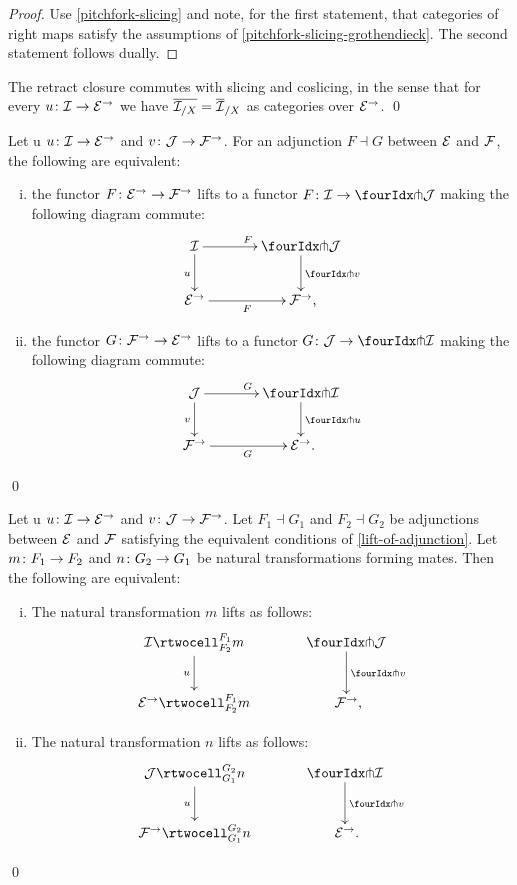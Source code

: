 \documentclass[reqno,10pt,a4paper,oneside,draft]{amsart}
\begin{document}
{{\begin{proof}
Use \cref{pitchfork-slicing} and note, for the first statement, that categories of right maps satisfy the assumptions of \cref{pitchfork-slicing-grothendieck}.
The second statement follows dually.
\end{proof}

\begin{proposition}
The retract closure commutes with slicing and coslicing, in the sense that for every $u \co \cal{I} \to \catE^\to$ we have
$\overline{\cal{I}_{/X}} = \overline{\cal{I}}_{/X}$ as categories over $\catE^\to$.
\qed
\end{proposition}




\begin{proposition} \label{lift-of-adjunction}
Let u $u \co \cal{I} \to \catE^\to$ and $v \co \cal{J} \to \cal{F}^\to$.
For an adjunction $F \dashv G$ between $\cal{E}$ and $\cal{F}$, the following are equivalent:
\begin{enumerate}[(i)]
\item the functor $F \co \catE^\to \to \cal{F}^\to$ lifts to a functor $F \co \cal{I} \to \liftl{\cal{J}}$ making the following diagram commute:
\[
\xymatrix@C=1.2cm{
  \cal{I}
  \ar[r]^{F}
  \ar[d]_{u}
&
  \liftl{\cal{J}}
  \ar[d]^{\liftl{v}}
\\
  \catE^\to
  \ar[r]_-{F}
&
  \cal{F}^\to
\rlap{,}}
\]
\item the functor $G \co \cal{F}^\to \to \catE^\to$ lifts to a functor $G \co \cal{J} \to \liftr{\cal{I}}$ making the following diagram commute:
\[
\xymatrix@C=1.2cm{
  \cal{J}
    \ar[d]_{v}
\ar[r]^{G}
&
  \liftr{\cal{I}}
  \ar[d]^{\liftr{u}}
\\
  \cal{F}^\to
   \ar[r]_{G}
&
  \catE^\to
\rlap{.}  }
\]
\end{enumerate}
\qed
\end{proposition}

\begin{proposition} \label{lift-of-mates}
Let u $u \co \cal{I} \to \catE^\to$ and $v \co \cal{J} \to \cal{F}^\to$.
Let $F_1 \dashv G_1$ and $F_2 \dashv G_2$ be adjunctions between $\cal{E}$ and $\cal{F}$ satisfying the equivalent conditions of \cref{lift-of-adjunction}.
Let $m \co F_1 \to F_2$ and $n \co G_2 \to G_1$ be natural transformations forming mates.
Then the following are equivalent:
\begin{enumerate}[(i)]
\item
The natural transformation $m$ lifts as follows:
\[
\xymatrix@C=1.2cm{
  \cal{I}
  \rtwocell_{F_2}^{F_1}{m}
  \ar[d]_{u}
&
  \liftl{\cal{J}}
  \ar[d]^{\liftl{v}}
\\
  \catE^\to
  \rtwocell_{F_2}^{F_1}{m}
&
  \cal{F}^\to
\rlap{,}}
\]
\item
The natural transformation $n$ lifts as follows:
\[
\xymatrix@C=1.2cm{
  \cal{J}
  \rtwocell_{G_1}^{G_2}{n}
  \ar[d]_{u}
&
  \liftr{\cal{I}}
  \ar[d]^{\liftl{v}}
\\
  \cal{F}^\to
  \rtwocell_{G_1}^{G_2}{n}
&
  \cal{E}^\to
\rlap{.}}
\]
\end{enumerate}
\qed
\end{proposition}



}}
\end{document}
